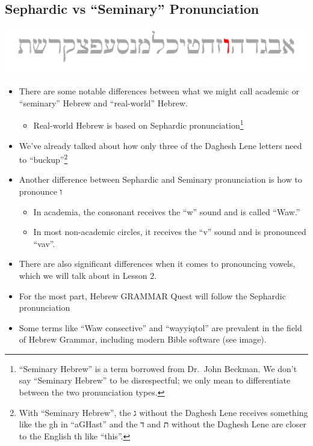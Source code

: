 \documentclass[
]{turabian-researchpaper}
\providecommand{\tightlist}{%
  \setlength{\itemsep}{0pt}\setlength{\parskip}{0pt}}
\begin{document}
\hypertarget{one_7}{%
\subsection{Sephardic vs ``Seminary'' Pronunciation}\label{one_7}}

\begin{center}\includegraphics[width=500pt]{images/vav} \end{center}

\begin{itemize}
\tightlist
\item
  There are some notable differences between what we might call academic or ``seminary'' Hebrew and ``real-world'' Hebrew.

  \begin{itemize}
  \tightlist
  \item
    Real-world Hebrew is based on Sephardic pronunciation\footnote{``Seminary Hebrew'' is a term borrowed from Dr.~John Beckman. We don't say ``Seminary Hebrew'' to be disrespectful; we only mean to differentiate between the two pronunciation types.}
  \end{itemize}
\item
  We've already talked about how only three of the Daghesh Lene letters need to ``buckup''\footnote{With ``Seminary Hebrew'', the ג without the Daghesh Lene receives something like the gh in ``aGHast'' and the ד and ת without the Daghesh Lene are closer to the English th like ``this''.}
\item
  Another difference between Sephardic and Seminary pronunciation is how to pronounce ו

  \begin{itemize}
  \tightlist
  \item
    In academia, the consonant receives the ``w'' sound and is called ``Waw.''
  \item
    In most non-academic circles, it receives the ``v'' sound and is pronounced ``vav''.
  \end{itemize}
\item
  There are also significant differences when it comes to pronouncing vowels, which we will talk about in Lesson 2.
\item
  For the most part, Hebrew GRAMMAR Quest will follow the Sephardic pronunciation
\item
  Some terms like ``Waw consective'' and ``wayyiqtol'' are prevalent in the field of Hebrew Grammar, including modern Bible software (see image).
\end{itemize}
\end{document}
